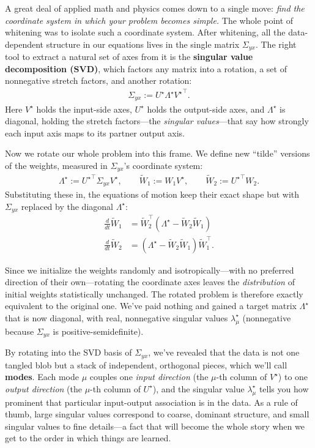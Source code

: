 A great deal of applied math and physics comes down to a single move: \emph{find
the coordinate system in which your problem becomes simple.} The whole point of whitening was to isolate such a coordinate system. After whitening, all the data-dependent structure in our equations lives in the single matrix $\Sigma_{yx}$. The right tool to extract a natural set of axes from it is the \textbf{singular value decomposition (SVD)}, which factors any matrix into a
rotation, a set of nonnegative stretch factors, and another rotation:
\begin{align*}
    \Sigma_{yx} := U^\star \Lambda^\star {V^\star}^\top.
\end{align*}
Here $V^\star$ holds the input-side axes, $U^\star$ holds the output-side axes,
and $\Lambda^\star$ is diagonal, holding the stretch factors---the \emph{singular
values}---that say how strongly each input axis maps to its partner output axis.

Now we rotate our whole problem into this frame. We define new ``tilde'' versions
of the weights, measured in $\Sigma_{yx}$'s coordinate system:
\begin{align*}
    \Lambda^\star := {U^\star}^\top \Sigma_{yx} V^\star, \qquad
    \tilde{W}_1 := W_1 V^\star, \qquad
    \tilde{W}_2 := {U^\star}^\top W_2.
\end{align*}
Substituting these in, the equations of motion keep their exact shape but with
$\Sigma_{yx}$ replaced by the diagonal $\Lambda^\star$:
\begin{align}
    \frac{d}{dt}\tilde{W}_1 &= \tilde{W}_2^\top(\Lambda^\star - \tilde{W}_2 \tilde{W}_1)
    \label{eq:W1-diag}\\
    \frac{d}{dt}\tilde{W}_2 &= (\Lambda^\star - \tilde{W}_2 \tilde{W}_1) \tilde{W}_1^\top
    \label{eq:W2-diag}.
\end{align}

Since we initialize the weights randomly and isotropically---with no
preferred direction of their own---rotating the coordinate axes leaves the
\emph{distribution} of initial weights statistically unchanged. The rotated
problem is therefore exactly equivalent to the original one. We've paid nothing
and gained a target matrix $\Lambda^\star$ that is now diagonal, with real,
nonnegative singular values $\lambda^\star_\mu$ (nonnegative because $\Sigma_{yx}$
is positive-semidefinite).

By rotating into the SVD basis of $\Sigma_{yx}$,
we've revealed that the data is not one tangled blob but a stack of independent,
orthogonal pieces, which we'll call \textbf{modes}. Each mode $\mu$ couples one
\emph{input direction} (the $\mu$-th column of $V^\star$) to one \emph{output
direction} (the $\mu$-th column of $U^\star$), and the singular value
$\lambda^\star_\mu$ tells you how prominent that particular input-output
association is in the data. As a rule of thumb, large singular values correspond
to coarse, dominant structure, and small singular values to fine details---a fact
that will become the whole story when we get to the order in which things are
learned.

